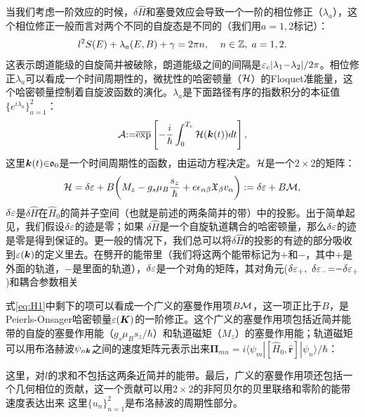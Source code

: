 当我们考虑一阶效应的时候，$\delta \hat{H}$和塞曼效应会导致一个一阶的相位修正（$\lambda_a$），这个相位修正一般而言对两个不同的自旋态是不同的（我们用$a{=}1,2$标记）：
\begin{equation}
l^2S(E)+\lambda_a(E,B)+\gamma=2\pi n,\;\;\;\;  n\in \mathbb{Z},\;a=1,2. \label{eq:rule}
\end{equation}
这表示朗道能级的自旋简并被破除，朗道能级之间的间隔是$\varepsilon_c|\lambda_1{-}\lambda_2|/2\pi$。相位修正$\lambda_a$可以看成一个时间周期性的，微扰性的哈密顿量（${\cal H}$）的Floquet准能量\cite{shirley_solution_1965}，这个哈密顿量控制着自旋波函数的演化。$\lambda_a$是下面路径有序的指数积分的本征值$\{e^{i\lambda_a}\}_{a=1}^2$：
\begin{equation}
{\cal A}{:}{=}\overline{\exp}\left[-\frac{i}{\hbar}\int_0^{T_c} {\cal H}(\boldsymbol{k}(t)) dt\right],
\label{eq:prop}
\end{equation}
这里$\boldsymbol{k}(t){\in}\mathfrak{o}_0$是一个时间周期性的函数，由运动方程决定。${\cal H}$是一个$2\times 2$的矩阵：
\begin{equation}
{\cal H}=\delta \varepsilon +B\bigg(M_z -g_s\mu_{B}\frac{s_z}{\hbar} + e\epsilon_{\alpha\beta}\mathfrak{X}_{\beta}v_{\alpha}\bigg):=\delta \varepsilon+B{\cal M},\label{eq:H1}
\end{equation}
$\delta \varepsilon$是$\delta \hat{H}$在$\hat{H}_0$的简并子空间（也就是前述的两条简并的带）中的投影。出于简单起见，我们假设$\delta \varepsilon$的迹是零；如果 $\delta\hat{H}$是一个自旋轨道耦合的哈密顿量，那么$\delta \varepsilon$的迹是零是得到保证的。更一般的情况下，我们总可以将$\delta \hat{H}$的投影的有迹的部分吸收到$\varepsilon(\boldsymbol{k})$的定义里去。在劈开的能带里（我们将这两个能带标记为${+}$和$-$，其中$+$是外面的轨道，$-$是里面的轨道），$\delta \varepsilon$是一个对角的矩阵，其对角元($\delta \varepsilon_+,~\delta \varepsilon_-{=}{-}\delta \varepsilon_+$)和耦合参数相关

式\ref{eq:H1}中剩下的项可以看成一个广义的塞曼作用项$B{\cal M}$，这一项正比于$B$，是Peierls-Onsager哈密顿量$\varepsilon(\boldsymbol{K})$的一阶修正\cite{rotheffham,blount_effham,kohn_effham}。这个广义的塞曼作用项包括近简并能带的自旋的塞曼作用能（$g_s\mu_Bs_z/\hbar$）和轨道磁矩（$M_z$）的塞曼作用能\cite{thonhauser_orbital_2005}；轨道磁矩可以用布洛赫波$\psi_{n\boldsymbol{k}}$之间的速度矩阵元表示出来$\boldsymbol{\Pi}_{mn}=i\langle\psi_m|[\hat{H}_0, \hat{\boldsymbol{r}}]|\psi_n\rangle/\hbar$：

这里，对$l$的求和不包括这两条近简并的能带。最后，广义的塞曼作用项还包括一个几何相位的贡献，这一个贡献可以用$2\times 2$的非阿贝尔的贝里联络\cite{berry_quantal_1984,wilczek_appearance_1984}和零阶的能带速度表达出来
这里$\{u_n\}_{n=1}^2$是布洛赫波的周期性部分。

